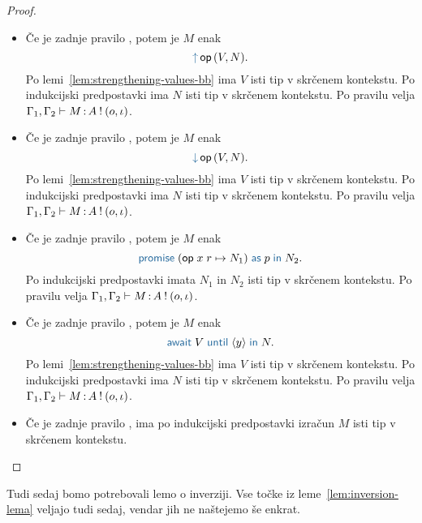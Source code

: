 \begin{proof}
\begin{itemize}
		\item Če je zadnje pravilo , potem je $M$ enak $$\tmopout{op}{V}{N}.$$
		Po lemi~\ref{lem:strengthening-values-bb} ima $V$ isti tip v skrčenem kontekstu.
		Po indukcijski predpostavki ima $N$ isti tip v skrčenem kontekstu.
		Po pravilu  velja $\Gamma_1, \Gamma_2 \vdash M \mathinner{:} A \mathbin{!} (o, \iota)$.
		
		\item Če je zadnje pravilo , potem je $M$ enak $$\tmopin{op}{V}{N}.$$
		Po lemi~\ref{lem:strengthening-values-bb} ima $V$ isti tip v skrčenem kontekstu.
		Po indukcijski predpostavki ima $N$ isti tip v skrčenem kontekstu.
		Po pravilu  velja $\Gamma_1, \Gamma_2 \vdash M \mathinner{:} A \mathbin{!} (o, \iota)$.
		
		\item Če je zadnje pravilo , potem je $M$ enak $$\tmwithrec{op}{x}{r}{N_1}{p}{N_2}.$$
		Po indukcijski predpostavki imata $N_1$ in $N_2$ isti tip v skrčenem kontekstu.
		Po pravilu  velja $\Gamma_1, \Gamma_2 \vdash M \mathinner{:} A \mathbin{!} (o, \iota)$.
		
		\item Če je zadnje pravilo , potem je $M$ enak $$\tmawait{V}{y}{N}.$$
		Po lemi~\ref{lem:strengthening-values-bb} ima $V$ isti tip v skrčenem kontekstu.
		Po indukcijski predpostavki ima $N$ isti tip v skrčenem kontekstu.
		Po pravilu  velja $\Gamma_1, \Gamma_2 \vdash M \mathinner{:} A \mathbin{!} (o, \iota)$.
		
		\item Če je zadnje pravilo , ima po indukcijski predpostavki izračun $M$ isti tip v skrčenem kontekstu.
		
	\end{itemize}
\end{proof}

Tudi sedaj bomo potrebovali lemo o inverziji. Vse točke iz leme~\ref{lem:inversion-lema} veljajo tudi sedaj, vendar jih ne naštejemo še enkrat.

